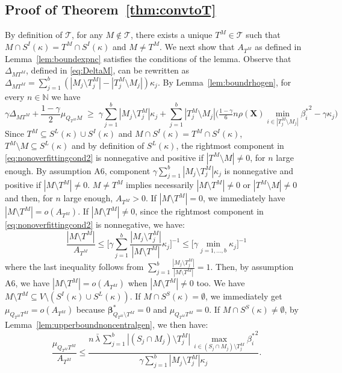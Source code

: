 \documentclass[aos]{imsart}
\theoremstyle{plain}
\newcommand{\N}{\mathbb{N}}
\newcommand{\T}{\mathcal{T}}
\newcommand{\bs}{\boldsymbol}
\begin{document}
\subsection{Proof of Theorem~\ref{thm:convtoT}}
By definition of $\T$, for any $M \not\in\T$, there exists a unique $T^M\in\T$ such that $M\cap S^{I}(\kappa)=T^M\cap S^{I}(\kappa)$ and $M\neq T^M$. We next show that $A_{T^M}$ as defined in Lemma~\ref{lem:boundexpnc} satisfies the conditions of the lemma. Observe that $\Delta_{MT^M}$, defined in \eqref{eq:DeltaM}, can be rewritten as $\Delta_{MT^M}=\sum_{j=1}^b(|M_j\setminus T^M_j|-|T^M_j\setminus M_j|)\kappa_j$. By  Lemma~\ref{lem:boundrhogen}, for every $n\in \N$ we have 
\begin{equation}\label{eq:nonoverfittingcond2}
   \gamma \Delta_{MT^M}+\frac{1-\gamma}{2}\mu_{Q_{T^M}M}\;\geq\; \gamma\sum_{j=1}^b|M_j \setminus T^M_j|\kappa_j + \sum_{j=1}^b |T^M_j\setminus M_j |\Big(\tfrac{1-\gamma}{6} n \rho(\bs X) \min_{i\in |T^M_j\setminus M_j|}{\beta^*_i}^{2} - \gamma\kappa_j\Big) 
\end{equation} 
Since $T^M \subseteq S^L(\kappa) \cup S^{I}(\kappa)$ and $M\cap S^{I}(\kappa)=T^M\cap S^{I}(\kappa)$, $T^M\setminus M \subseteq S^L(\kappa)$ and by definition of $S^L(\kappa)$, the rightmost component in \eqref{eq:nonoverfittingcond2} is nonnegative and positive if $|T^M\setminus M|\neq0$, for $n$ large enough. By assumption A6, component $\gamma\sum_{j=1}^b|M_j \setminus T^M_j|\kappa_j$ is nonnegative and positive if $|M\setminus T^M|\neq0$.  $M\neq T^M$ implies necessarily $|M\setminus T^M|\neq0$ or $|T^M\setminus M|\neq0$ and then, for $n$ large enough, $A_{T^M}>0$. If $|M\setminus T^M|=0$, we immediately have $|M\setminus T^M|=o(A_{T^M})$. If $|M\setminus T^M|\neq 0$, since the rightmost component in \eqref{eq:nonoverfittingcond2} is nonnegative, we have:
$$\frac{|M\setminus T^M|}{A_{T^M}}\leq \bigg[ \gamma\sum_{j=1}^b\frac{|M_j \setminus T^M_j|}{|M\setminus T^M|}\kappa_j \bigg]^{-1} \leq \bigg[ \gamma\min_{j=1,\ldots,b}\kappa_j \bigg]^{-1} $$
where the last inequality follows from $\sum_{j=1}^b\frac{|M_j \setminus T^M_j|}{|M\setminus T^M|}=1$. Then, by assumption A6, we have $|M\setminus T^M|=o(A_{T^M})$ when $|M\setminus T^M|\neq 0$ too. 
We have $M\setminus T^M\subseteq V\setminus (S^{I}(\kappa) \cup S^L(\kappa))$. If $M\cap S^{S}(\kappa)=\emptyset$, we immediately get $\mu_{Q_{T^M} T^M}=o(A_{T^M})$ because $\bs\beta^*_{Q_{T^M} \setminus T^M}=0$ and $\mu_{Q_{T^M} T^M}=0$. If $M\cap S^{S}(\kappa)\neq\emptyset$, by Lemma~\ref{lem:upperboundnoncentralgen}, we then have:
$$\frac{\mu_{Q_{T^M} T^M}}{ A_{T^M}} \leq \frac{n\,\bar{\lambda}\,\sum_{j=1}^b|(S_j\cap M_j )\setminus T^M_j|\,\max_{i\in (S_j\cap M_j )\setminus T^M_j}{\beta_{i}^*}^2}{ \gamma\sum_{j=1}^b|M_j \setminus T^M_j|\kappa_j}.$$
\end{document}

